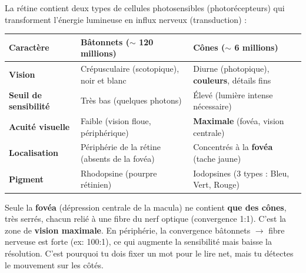 \documentclass[11pt]{article}
\begin{document}
\begin{definition}
La rétine contient deux types de cellules photosensibles (photorécepteurs) qui transforment l'énergie lumineuse en influx nerveux (transduction) :
\begin{center}
\begin{tabularx}{\linewidth}{|l|X|X|}\hline
\rowcolor{popblueL}
\textbf{Caractère} & \textbf{Bâtonnets ($\sim$ 120 millions)} & \textbf{Cônes ($\sim$ 6 millions)} \\ \hline
\textbf{Vision} & Crépusculaire (scotopique), noir et blanc & Diurne (photopique), \textbf{couleurs}, détails fins \\ \hline
\textbf{Seuil de sensibilité} & Très bas (quelques photons) & Élevé (lumière intense nécessaire) \\ \hline
\textbf{Acuité visuelle} & Faible (vision floue, périphérique) & \textbf{Maximale} (fovéa, vision centrale) \\ \hline
\textbf{Localisation} & Périphérie de la rétine (absents de la fovéa) & Concentrés à la \textbf{fovéa} (tache jaune) \\ \hline
\textbf{Pigment} & Rhodopsine (pourpre rétinien) & Iodopsines (3 types : Bleu, Vert, Rouge) \\ \hline
\end{tabularx}
\end{center}
\end{definition}

\begin{savaistu}
Seule la \textbf{fovéa} (dépression centrale de la macula) ne contient \textbf{que des cônes}, très serrés, chacun relié à une fibre du nerf optique (convergence 1:1). C'est la zone de \textbf{vision maximale}. En périphérie, la convergence bâtonnets $\to$ fibre nerveuse est forte (ex: 100:1), ce qui augmente la sensibilité mais baisse la résolution. C'est pourquoi tu dois fixer un mot pour le lire net, mais tu détectes le mouvement sur les côtés.
\end{savaistu}
\end{document}
